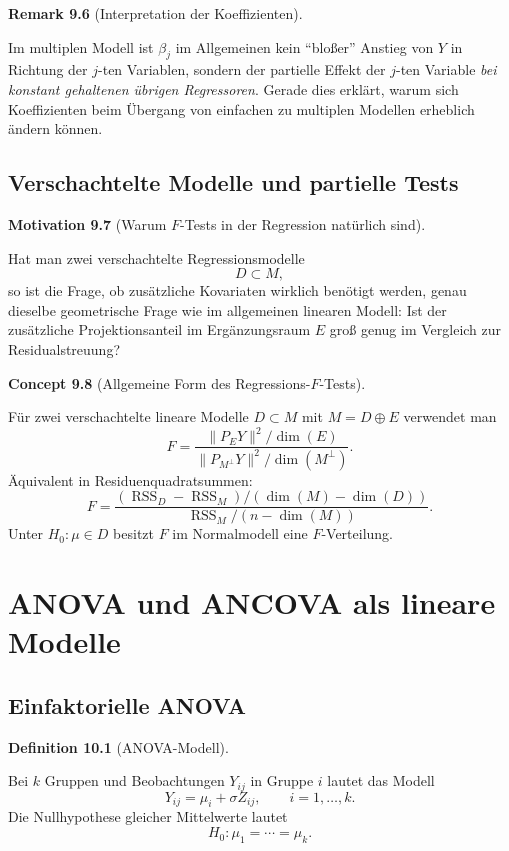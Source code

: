 \documentclass[10pt, letterpaper]{article}
\newcommand{\CustomHeading}[3]{%
  \par\medskip\noindent%
  \textbf{#1 #2} \textnormal{(#3)}.\enskip%
}
\newenvironment{DEF}[2]{\CustomHeading{Definition}{#1}{#2}}{}
\newenvironment{REM}[2]{\CustomHeading{Remark}{#1}{#2}}{}
\newenvironment{CONC}[2]{\CustomHeading{Concept}{#1}{#2}}{}
\newenvironment{MOT}[2]{\CustomHeading{Motivation}{#1}{#2}}{}
\begin{document}
\begin{REM}{9.6}{Interpretation der Koeffizienten}
Im multiplen Modell ist \(\beta_j\) im Allgemeinen kein ``bloßer'' Anstieg von \(Y\) in Richtung der \(j\)-ten Variablen, sondern der partielle Effekt der \(j\)-ten Variable \emph{bei konstant gehaltenen übrigen Regressoren}. Gerade dies erklärt, warum sich Koeffizienten beim Übergang von einfachen zu multiplen Modellen erheblich ändern können.
\end{REM}

\subsection{Verschachtelte Modelle und partielle Tests}

\begin{MOT}{9.7}{Warum \(F\)-Tests in der Regression natürlich sind}
Hat man zwei verschachtelte Regressionsmodelle
\[
D\subset M,
\]
so ist die Frage, ob zusätzliche Kovariaten wirklich benötigt werden, genau dieselbe geometrische Frage wie im allgemeinen linearen Modell: Ist der zusätzliche Projektionsanteil im Ergänzungsraum \(E\) groß genug im Vergleich zur Residualstreuung?
\end{MOT}

\begin{CONC}{9.8}{Allgemeine Form des Regressions-\(F\)-Tests}
Für zwei verschachtelte lineare Modelle \(D\subset M\) mit \(M=D\oplus E\) verwendet man
\[
F=\frac{\|P_EY\|^2/\dim(E)}{\|P_{M^\perp}Y\|^2/\dim(M^\perp)}.
\]
Äquivalent in Residuenquadratsummen:
\[
F=
\frac{(\operatorname{RSS}_D-\operatorname{RSS}_M)/(\dim(M)-\dim(D))}
{\operatorname{RSS}_M/(n-\dim(M))}.
\]
Unter \(H_0:\mu\in D\) besitzt \(F\) im Normalmodell eine \(F\)-Verteilung.
\end{CONC}

\section{ANOVA und ANCOVA als lineare Modelle}

\subsection{Einfaktorielle ANOVA}

\begin{DEF}{10.1}{ANOVA-Modell}
Bei \(k\) Gruppen und Beobachtungen \(Y_{ij}\) in Gruppe \(i\) lautet das Modell
\[
Y_{ij}=\mu_i+\sigma Z_{ij},
\qquad i=1,\dots,k.
\]
Die Nullhypothese gleicher Mittelwerte lautet
\[
H_0:\mu_1=\cdots=\mu_k.
\]
\end{DEF}
\end{document}
